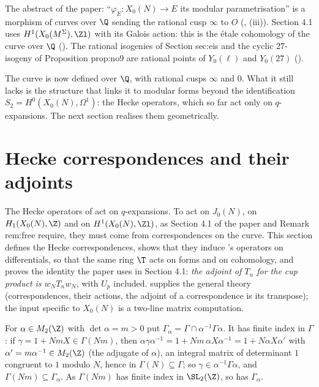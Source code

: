 \begin{paperlink}\label{pl:moddeg:over-q}
The abstract of the paper: ``$\varphi_E\colon X_0(N)\to E$ its modular parametrisation'' is a morphism of curves over $\Q$ sending the rational cusp $\infty$ to $O$
(, (iii)). Section 4.1 uses $H^1(X_0(M^\Sigma),\Zl)$ with its Galois action: this is the
\'etale cohomology of the curve over $\Q$ (). The rational isogenies of Section sec:eis and the cyclic $27$-isogeny of
Proposition prop:no9 are rational points of $Y_0(\ell)$ and $Y_0(27)$ ().
\end{paperlink}

The curve is now defined over $\Q$, with rational cusps $\infty$ and $0$. What it still lacks is the structure that links it to modular forms beyond the
identification $S_2=H^0(X_0(N),\Omega^1)$: the Hecke operators, which so far act only on $q$-expansions. The next section realises them geometrically.

\section{Hecke correspondences and their adjoints}\label{sec:moddeg:hecke}

The Hecke operators of  act on $q$-expansions. To act on $J_0(N)$, on $H_1(X_0(N),\Z)$ and on $H^1(X_0(N),\Zl)$, as Section 4.1 of the paper and
Remark rem:free require, they must come from correspondences on the curve. This section defines the Hecke correspondences, shows that they induce
's operators on differentials, so that the same ring $\T$ acts on forms and on cohomology, and proves the identity the paper uses in
Section 4.1: \emph{the adjoint of $T_n$ for the cup product is $w_NT_nw_N$}, with $U_p$ included.  supplies the general theory (correspondences,
their actions, the adjoint of a correspondence is its transpose); the input specific to $X_0(N)$ is a two-line matrix computation.

For $\alpha\in M_2(\Z)$ with $\det\alpha=m>0$ put $\Gamma_\alpha=\Gamma\cap\alpha^{-1}\Gamma\alpha$. It has finite index in $\Gamma$: if $\gamma=1+NmX\in\Gamma(Nm)$, then
$\alpha\gamma\alpha^{-1}=1+Nm\,\alpha X\alpha^{-1}=1+N\alpha X\alpha'$ with $\alpha'=m\alpha^{-1}\in M_2(\Z)$ (the adjugate of $\alpha$), an integral matrix of determinant $1$ congruent to $1$
modulo $N$, hence in $\Gamma(N)\subseteq\Gamma$; so $\gamma\in\alpha^{-1}\Gamma\alpha$, and $\Gamma(Nm)\subseteq\Gamma_\alpha$. As $\Gamma(Nm)$ has finite index in $\SL_2(\Z)$, so has $\Gamma_\alpha$.

